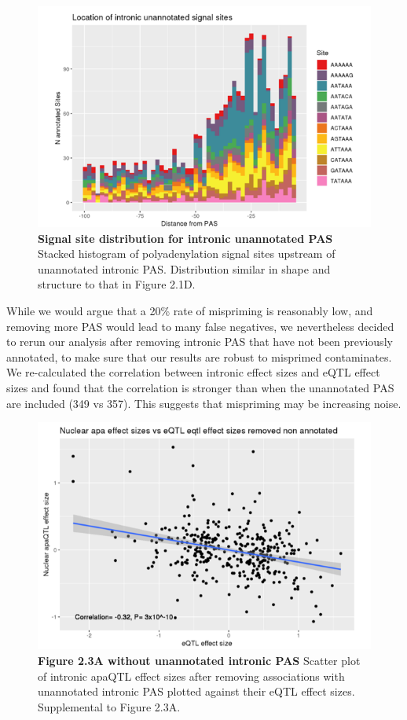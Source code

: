 \begin{figure}
\centering \includegraphics[width=5in]{img/ch02/figureAppendix7.png}
\caption[Signal site distribution for intronic unannotated PAS]{\textbf{Signal site distribution for intronic unannotated PAS} Stacked histogram of polyadenylation signal sites upstream of unannotated intronic PAS. Distribution similar in shape and structure to that in Figure 2.1D. }
\label{fig:Supplementaryfile1-Fig7}
\end{figure} 


While we would argue that a 20\% rate of mispriming is reasonably low, and removing more PAS would lead to many false negatives, we nevertheless decided to rerun our analysis after removing intronic PAS that have not been previously annotated, to make sure that our results are robust to misprimed contaminates. We re-calculated the correlation between intronic effect sizes and eQTL effect sizes and found that the correlation is stronger than when the unannotated PAS are included (349 vs 357). This suggests that mispriming may be increasing noise. 

\begin{figure}
\centering \includegraphics[width=5in]{img/ch02/figureAppendix8.png}
\caption[Figure 2.3A without unannotated intronic PAS]{\textbf{Figure 2.3A without unannotated intronic PAS} Scatter plot of intronic apaQTL effect sizes after removing associations with unannotated intronic PAS plotted against their eQTL effect sizes. Supplemental to Figure 2.3A. }
\label{fig:Supplementaryfile1-Fig8}
\end{figure} 



